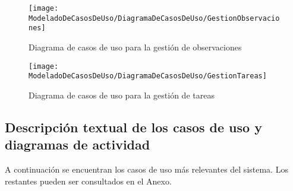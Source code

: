     \begin{figure}[H]
		\centering
		\texttt{[image: ModeladoDeCasosDeUso/DiagramaDeCasosDeUso/GestionObservaciones]}
		\caption{Diagrama de casos de uso para la gestión de observaciones}
	\label{fig:GestionObservaciones}
	\end{figure}
	\begin{figure}[H]
		\centering
		\texttt{[image: ModeladoDeCasosDeUso/DiagramaDeCasosDeUso/GestionTareas]}
		\caption{Diagrama de casos de uso para la gestión de tareas}
	\label{fig:GestionTareas}
	\end{figure}
	\clearpage %
	\subsection{Descripción textual de los casos de uso y diagramas de actividad}
		A continuación se encuentran los casos de uso más relevantes del sistema. Los restantes pueden ser consultados en el Anexo.
		
		
		
		
		
		
		

		
		
		

		

		
		
		
		
		
		
		
		
		

